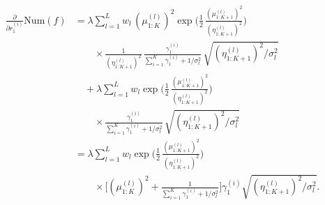 

\begin{equation}
\begin{split}
    \frac{\partial}{\partial r_1^{(i)}} \text{Num}(f)
    & = \lambda \sum_{l=1}^L w_l \, (\mu^{(l)}_{1:K})^2 \exp \bigg( \frac{1}{2} \, \frac{(\mu^{(l)}_{1:K+1})^2}{(\eta^{(l)}_{1:K+1})^2} \bigg) \\
    & \qquad \times \frac{1}{(\eta^{(l)}_{1:K+1})^2} \, \frac{\gamma_1^{(i)}}{\sum_{i=1}^K \gamma_1^{(i)} + 1/\sigma_l^2} \, \sqrt{(\eta^{(l)}_{1:K+1})^2 / \sigma_l^2} \\
    & \quad + \lambda \sum_{l=1}^L w_l \exp \bigg( \frac{1}{2} \, \frac{(\mu^{(l)}_{1:K+1})^2}{(\eta^{(l)}_{1:K+1})^2} \bigg) \\
    & \qquad \times \frac{\gamma_1^{(i)}}{\sum_{i=1}^K \gamma_1^{(i)} + 1/\sigma_l^2} \, \sqrt{(\eta^{(l)}_{1:K+1})^2 / \sigma_l^2} \\
    & = \lambda \sum_{l=1}^L w_l \exp \bigg( \frac{1}{2} \, \frac{(\mu^{(l)}_{1:K+1})^2}{(\eta^{(l)}_{1:K+1})^2} \bigg) \\
    & \qquad \times \bigg[ (\mu^{(l)}_{1:K})^2 + \frac{1}{\sum_{i=1}^K \gamma_1^{(i)} + 1/\sigma_l^2} \bigg] \gamma_1^{(i)} \sqrt{(\eta^{(l)}_{1:K+1})^2 / \sigma_l^2}.
\end{split}
\end{equation}

